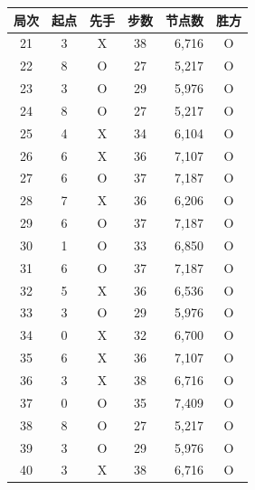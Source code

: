 \begin{tabular}{ccccrc}
\toprule
局次 & 起点 & 先手 & 步数 & 节点数 & 胜方 \\
\midrule
21 & 3 & X & 38 & 6,716 & O \\
22 & 8 & O & 27 & 5,217 & O \\
23 & 3 & O & 29 & 5,976 & O \\
24 & 8 & O & 27 & 5,217 & O \\
25 & 4 & X & 34 & 6,104 & O \\
26 & 6 & X & 36 & 7,107 & O \\
27 & 6 & O & 37 & 7,187 & O \\
28 & 7 & X & 36 & 6,206 & O \\
29 & 6 & O & 37 & 7,187 & O \\
30 & 1 & O & 33 & 6,850 & O \\
31 & 6 & O & 37 & 7,187 & O \\
32 & 5 & X & 36 & 6,536 & O \\
33 & 3 & O & 29 & 5,976 & O \\
34 & 0 & X & 32 & 6,700 & O \\
35 & 6 & X & 36 & 7,107 & O \\
36 & 3 & X & 38 & 6,716 & O \\
37 & 0 & O & 35 & 7,409 & O \\
38 & 8 & O & 27 & 5,217 & O \\
39 & 3 & O & 29 & 5,976 & O \\
40 & 3 & X & 38 & 6,716 & O \\
\bottomrule
\end{tabular}
